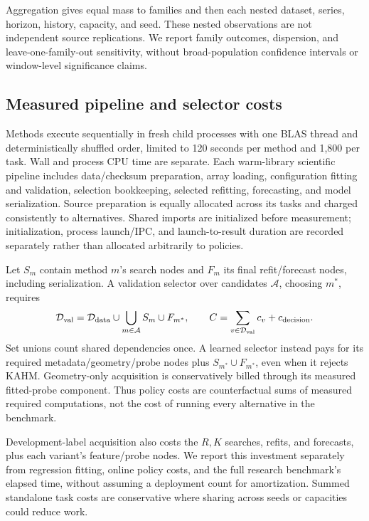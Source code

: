 Aggregation gives equal mass to families and then each nested dataset, series,
horizon, history, capacity, and seed.  These nested observations are not
independent source replications.  We report family outcomes, dispersion, and
leave-one-family-out sensitivity, without broad-population confidence intervals
or window-level significance claims.

\subsection{Measured pipeline and selector costs}
\label{sec:nf-costs}

Methods execute sequentially in fresh child processes with one BLAS thread
and deterministically shuffled order, limited to 120 seconds per method and
1,800 per task.  Wall and process CPU time are separate.  Each warm-library
scientific pipeline includes
data/checksum preparation, array loading, configuration fitting and validation,
selection bookkeeping, selected refitting, forecasting, and model serialization.
Source preparation is equally allocated across its tasks and charged consistently
to alternatives.  Shared imports are initialized before measurement;
initialization, process launch/IPC, and launch-to-result duration are recorded
separately rather than allocated arbitrarily to policies.

Let $S_m$ contain method $m$'s search nodes and $F_m$ its final refit/forecast
nodes, including serialization.  A validation selector over candidates
$\mathcal A$, choosing $m^*$, requires
\begin{equation}
 \mathcal D_{\rm val}=\mathcal D_{\rm data}
      \cup\bigcup_{m\in\mathcal A}S_m\cup F_{m^*},\qquad
 C=\sum_{v\in\mathcal D_{\rm val}}c_v+c_{\rm decision}.
 \label{eq:nf-selector-cost}
\end{equation}
Set unions count shared dependencies once.  A learned selector instead pays
for its required metadata/geometry/probe nodes plus $S_{m^*}\cup F_{m^*}$,
even when it rejects KAHM.  Geometry-only acquisition is conservatively billed
through its measured fitted-probe component.  Thus policy costs are
counterfactual sums of measured required computations, not the cost of running
every alternative in the benchmark.

Development-label acquisition also costs the $R,K$ searches, refits, and
forecasts, plus each variant's feature/probe nodes.  We report this investment
separately from regression fitting, online policy costs, and the full research
benchmark's elapsed time, without assuming a deployment count for amortization.
Summed standalone task costs are conservative where sharing across seeds or
capacities could reduce work.

